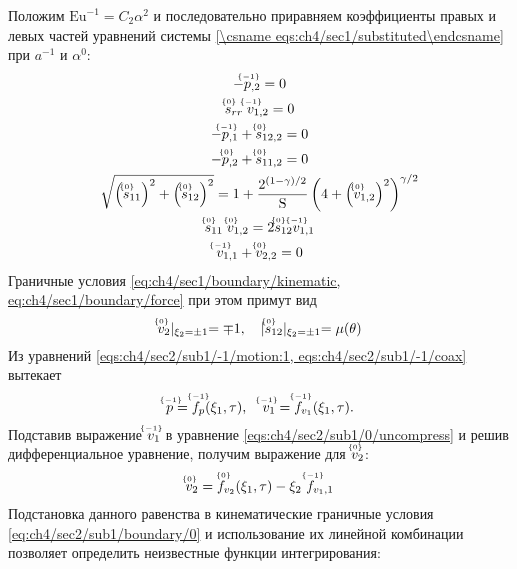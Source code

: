 Положим $\text{Eu}^{-1} = C_2 \alpha^2$ и последовательно приравняем коэффициенты правых и левых частей уравнений системы \cref{\csname eqs:ch4/sec1/substituted\endcsname} при $a^{-1}$ и $\alpha^0$:
\label{eqs:ch4/sec2/sub1/main}
\begin{gather}
  \label{eqs:ch4/sec2/sub1/-1/motion:1}
  -\uindex{p}{-1}_{,2} = 0
  \\
  \label{eqs:ch4/sec2/sub1/-1/coax}
  \uindex{s}{0}_{rr} \; \uindex{v}{-1}_{1,2} = 0
  \\
  \label{eqs:ch4/sec2/sub1/0/motion:1}
  -\uindex{p}{-1}_{,1} + \uindex{s}{0}_{12,2} = 0
  \\
  \label{eqs:ch4/sec2/sub1/0/motion:2}
  -\uindex{p}{0}_{,2} + \uindex{s}{0}_{11,2} = 0
  \\
  \label{eqs:ch4/sec2/sub1/0/plasticity}
  \sqrt{\left(\uindex{s}{0}_{11}\right)^2 + \left(\uindex{s}{0}_{12}\right)^2} = 1 + \frac{2^{(1-\gamma)/2}}{\text{S}} \left(4+\left(\uindex{v}{0}_{1,2}\right)^2\right)^{\gamma/2}
  \\
  \label{eqs:ch4/sec2/sub1/0/coax}
  \uindex{s}{0}_{11} \; \uindex{v}{0}_{1,2} = 2 \uindex{s}{0}_{12} \uindex{v}{-1}_{1,1}
  \\
  \label{eqs:ch4/sec2/sub1/0/uncompress}
  \uindex{v}{-1}_{1,1} + \uindex{v}{0}_{2,2} = 0
\end{gather}
Граничные условия \cref{eq:ch4/sec1/boundary/kinematic, eq:ch4/sec1/boundary/force} при этом примут вид
\begin{equation}
  \label{eq:ch4/sec2/sub1/boundary/0}
  \uindex{v}{0}_{2}\lvert_{\xi_2=\pm 1} = \mp 1, \quad \lvert \uindex{s}{0}_{12}\lvert_{\xi_2=\pm 1} = \mu(\theta)
\end{equation}
Из уравнений \cref{eqs:ch4/sec2/sub1/-1/motion:1, eqs:ch4/sec2/sub1/-1/coax} вытекает
\begin{equation*}
  \uindex{p}{-1} = \uindex{f}{-1}_{p}(\xi_1, \tau), \quad \uindex{v}{-1}_{1} = \uindex{f}{-1}_{v_{1}}(\xi_1, \tau).
\end{equation*}
Подставив выражение $\uindex{v}{-1}_{1}$ в уравнение \cref{eqs:ch4/sec2/sub1/0/uncompress} и решив дифференциальное уравнение, получим выражение для $\uindex{v}{0}_{2}$:
\begin{equation*}
  \uindex{v}{0}_{2} = \uindex{f}{0}_{v_{2}}(\xi_1, \tau) - \xi_2 \ \uindex{f}{-1}_{v_{1},1}
\end{equation*}
Подстановка данного равенства в кинематические граничные условия \cref{eq:ch4/sec2/sub1/boundary/0} и использование их линейной комбинации позволяет определить неизвестные функции интегрирования:
